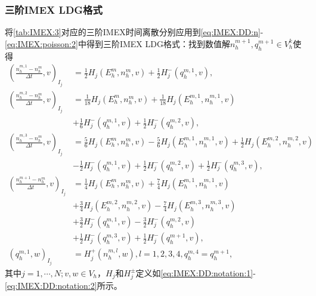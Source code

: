 \subsubsection{三阶IMEX LDG格式}
将\autoref{tab:IMEX:3}对应的三阶IMEX时间离散分别应用到\eqref{eq:IMEX:DD:n}-\eqref{eq:IMEX:poisson:2}中得到三阶IMEX LDG格式：找到数值解$n_h^{m+1}, q_h^{m+1}\in V_h^k$使得
\begin{align}
    (\frac{n_h^{m,1} -n_h^m}{\Delta t},v)_{I_j} & =\frac{1}{2} H_j(E_h^m,n_h^m,v) + \frac{1}{2} H_j^-(q_h^{m,1},v),           \label{eq:IMEX:DD:LDG:1}                       \\
    (\frac{n_h^{m,2} -n_h^m}{\Delta t},v)_{I_j} & = \frac{1}{18} H_j(E_h^m,n_h^m,v) + \frac{1}{18} H_j(E_h^{m,1},n_h^{m,1},v) \nonumber                                      \\
                                                & + \frac{1}{6} H_j^-(q_h^{m,1},v) + \frac{1}{2} H_j^-(q_h^{m,2},v),                                                         \\
    (\frac{n_h^{m,3} -n_h^m}{\Delta t},v)_{I_j} & =\frac{5}{6} H_j(E_h^m,n_h^m,v) -\frac{5}{6} H_j(E_h^{m,1},n_h^{m,1},v) + \frac{1}{2} H_j(E_h^{m,2},n_h^{m,2},v) \nonumber \\
                                                & - \frac{1}{2} H_j^-(q_h^{m,1},v) + \frac{1}{2} H_j^-(q_h^{m,2},v) + \frac{1}{2} H_j^-(q_h^{m,3},v),                        \\
    (\frac{n_h^{m+1} -n_h^m}{\Delta t},v)_{I_j} & = \frac{1}{4} H_j(E_h^m,n_h^m,v) +\frac{7}{4} H_j(E_h^{m,1},n_h^{m,1},v)  \nonumber                                        \\
                                                & + \frac{3}{4} H_j(E_h^{m,2},n_h^{m,2},v) - \frac{7}{4} H_j(E_h^{m,3},n_h^{m,3},v) \nonumber                                \\
                                                & +\frac{3}{2} H_j^-(q_h^{m,1},v) -\frac{3}{2} H_j^-(q_h^{m,2},v) \nonumber                                                  \\
                                                & + \frac{1}{2} H_j^-(q_h^{m,3},v)  + \frac{1}{2} H_j^-(q_h^{m+1},v),                                                        \\
    (q_h^{m,1},w)_{I_j}                         & = H_j^+(n_h^{m,l},w), l = 1,2,3,4, q_h^{m,4} = q_h^{m+1},\label{eq:IMEX:DD:LDG:4}
\end{align}
其中$j = 1,\cdots,N;v,w \in V_h$，$H_j$和$H_j^{\pm}$定义如\eqref{eq:IMEX:DD:notation:1}-\eqref{eq:IMEX:DD:notation:2}所示。


